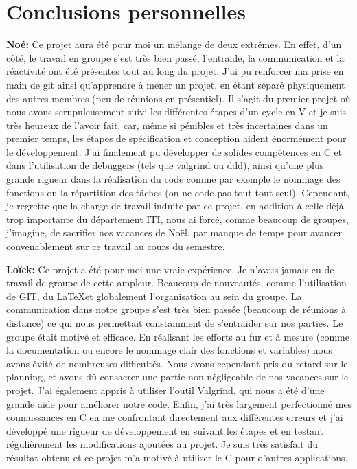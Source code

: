 \documentclass{article}
\begin{document}
\clearpage
\section{Conclusions personnelles}


\textbf{Noé:} 
Ce projet aura été pour moi un mélange de deux extrêmes.
En effet, d'un côté, le travail en groupe s'est très bien passé, l'entraide, la communication et la réactivité ont été présentes tout au long du projet.
J'ai pu renforcer ma prise en main de git ainsi qu'apprendre à mener un projet, en étant séparé physiquement des autres membres (peu de réunions en présentiel).
Il s'agit du premier projet où nous avons scrupuleusement suivi les différentes étapes d'un cycle en V et je suis très heureux de l'avoir fait, car, même si pénibles et très incertaines dans un premier temps, les étapes de spécification et conception aident énormément pour le développement.
J'ai finalement pu développer de solides compétences en C et dans l'utilisation de debuggers (tels que valgrind ou ddd), ainsi qu'une plus grande rigueur dans la réalisation du code comme par exemple le nommage des fonctions ou la répartition des tâches (on ne code pas tout tout seul).
Cependant, je regrette que la charge de travail induite par ce projet, en addition à celle déjà trop importante du département ITI, nous ai forcé, comme beaucoup de groupes, j'imagine, de sacrifier nos vacances de Noël, par manque de temps pour avancer convenablement sur ce travail au cours du semestre.
\medskip

\textbf{Loïck:}
Ce projet a été pour moi une vraie expérience. Je n’avais jamais eu de travail de groupe de cette ampleur. Beaucoup de nouveautés, comme l’utilisation de GIT, du \LaTeX et globalement l’organisation au sein du groupe. La communication dans notre groupe s’est très bien passée (beaucoup de réunions à distance) ce qui nous permettait constamment de s’entraider sur nos parties. Le groupe était motivé et efficace. En réalisant les efforts au fur et à mesure (comme la documentation ou encore le nommage clair des fonctions et variables) nous avons évité de nombreuses difficultés. Nous avons cependant pris du retard sur le planning, et avons dû consacrer une partie non-négligeable de nos vacances sur le projet.
J’ai également appris à utiliser l’outil Valgrind, qui nous a été d’une grande aide pour améliorer notre code. Enfin, j’ai très largement perfectionné mes connaissances en C en me confrontant directement aux différentes erreurs et j’ai développé une rigueur de développement en suivant les étapes et en testant régulièrement les modifications ajoutées au projet. Je suis très satisfait du résultat obtenu et ce projet m’a motivé à utiliser le C pour d’autres applications.
\medskip
\end{document}
